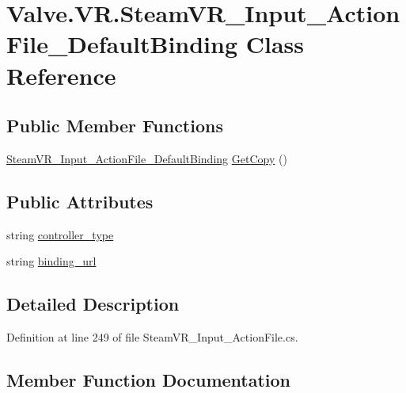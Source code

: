 \hypertarget{class_valve_1_1_v_r_1_1_steam_v_r___input___action_file___default_binding}{}\section{Valve.\+V\+R.\+Steam\+V\+R\+\_\+\+Input\+\_\+\+Action\+File\+\_\+\+Default\+Binding Class Reference}
\label{class_valve_1_1_v_r_1_1_steam_v_r___input___action_file___default_binding}
\subsection*{Public Member Functions}
\begin{DoxyCompactItemize}
\item 
\mbox{\hyperlink{class_valve_1_1_v_r_1_1_steam_v_r___input___action_file___default_binding}{Steam\+V\+R\+\_\+\+Input\+\_\+\+Action\+File\+\_\+\+Default\+Binding}} \mbox{\hyperlink{class_valve_1_1_v_r_1_1_steam_v_r___input___action_file___default_binding_a8d7f0b6fc4f28694ea2783e22afe3b84}{Get\+Copy}} ()
\end{DoxyCompactItemize}
\subsection*{Public Attributes}
\begin{DoxyCompactItemize}
\item 
string \mbox{\hyperlink{class_valve_1_1_v_r_1_1_steam_v_r___input___action_file___default_binding_ac92e854a598bd2ea1cb851586c3f2d6b}{controller\+\_\+type}}
\item 
string \mbox{\hyperlink{class_valve_1_1_v_r_1_1_steam_v_r___input___action_file___default_binding_a880dd2f0b223fd7064e03234d66a79a7}{binding\+\_\+url}}
\end{DoxyCompactItemize}


\subsection{Detailed Description}


Definition at line 249 of file Steam\+V\+R\+\_\+\+Input\+\_\+\+Action\+File.\+cs.



\subsection{Member Function Documentation}
\mbox{\label{class_valve_1_1_v_r_1_1_steam_v_r___input___action_file___default_binding_a8d7f0b6fc4f28694ea2783e22afe3b84}} 

